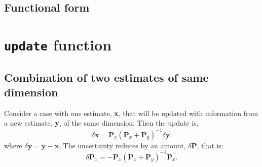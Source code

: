 \documentclass{article}
\begin{document}
\subsection{Functional form}
\label{sec:functional-form}

\section{\texttt{update} function}

\subsection{Combination of two estimates of same dimension}
\label{sec:basic-form}

Consider a case with one estimate, \textbf{x}, that will be updated with information from a new estimate, \textbf{y}, of the same dimension.
Then the update is,
\begin{equation}
\label{eq:15}
\delta\mathbf{x} = \mathbf{P}_x (\mathbf{P}_x + \mathbf{P}_y )^{-1} \delta\mathbf{y} .
\end{equation}
where $\delta \mathbf{y} = \mathbf{y} - \mathbf{x}$.
The uncertainty reduces by an amount, $\delta\mathbf{P}$, that is:
\begin{equation}
\label{eq:16}
\delta\mathbf{P}_{x} = - \mathbf{P}_x (\mathbf{P}_x + \mathbf{P}_y )^{-1} \mathbf{P}_x.
\end{equation}
\end{document}
